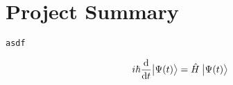 \section{Project Summary}

\lipsum[2]\texttt{asdf}

\begin{equation}
  i \hbar \frac{\dd}{\mathrm{d} t}\ket[\big]{\Psi(t)} = \hat{H}\: \ket[\big]{\Psi(t)} 
\end{equation}
